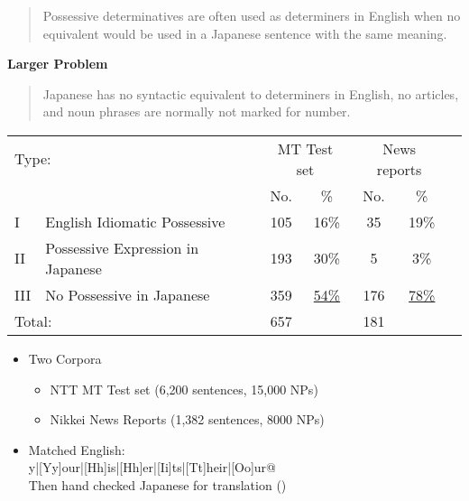 \documentclass[a4paper,landscape,headrule,footrule,xetex]{foils}
\begin{document}




\begin{quote}
  Possessive determinatives are often used as determiners in English
  when no equivalent would be used in a Japanese sentence with the
  same meaning.
\end{quote}
{\bf Larger Problem}
\begin{quote}
  Japanese has no syntactic equivalent to determiners in English,
  no articles, and noun phrases are normally not marked for number.
\end{quote}




\noindent\begin{tabular}{llccccc}
  \multicolumn{2}{l}{Type:}  &
  \multicolumn{2}{c}{MT Test set} &
  \multicolumn{2}{c}{News reports} \\
   & & No.  & \%  & No.  & \%  \\ \hline
   I & English Idiomatic Possessive & 105 & 16\% & 35 & 19\% \\
   II & Possessive Expression in Japanese & 193 & 30\% & 5 & 3\% \\
   III &No Possessive in Japanese & 359 &  \underline{54\%}& 176 & \underline{78\%} \\
  \multicolumn{2}{l}{Total:} &  657 & & 181 & 
\end{tabular}

\begin{itemize}
\item Two Corpora
  \begin{itemize}
  \item NTT MT Test set (6,200 sentences, 15,000 NPs)
  \item Nikkei News Reports (1,382 sentences, 8000 NPs)
  \end{itemize}
\item Matched English:
\\  \verb@[Mm]y|[Yy]our|[Hh]is|[Hh]er|[Ii]ts|[Tt]heir|[Oo]ur@
\\ Then hand checked Japanese for translation ()
\end{itemize}

\end{document}
